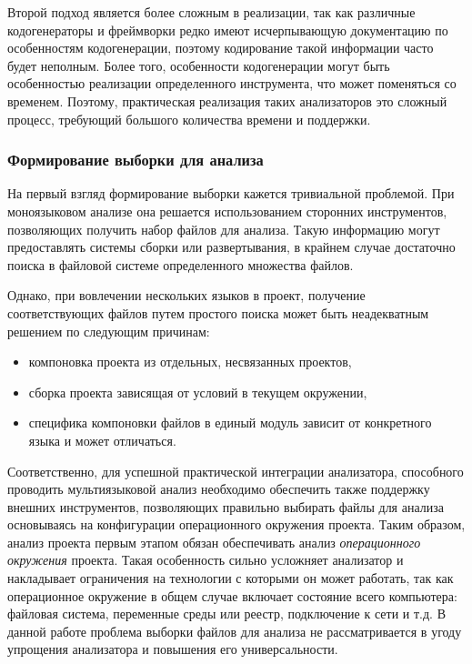 Второй подход является более сложным в реализации, так как различные кодогенераторы и фреймворки редко
имеют исчерпывающую документацию по особенностям кодогенерации, поэтому кодирование такой информации
часто будет неполным. Более того, особенности кодогенерации могут быть особенностью реализации
определенного инструмента, что может поменяться со временем. Поэтому, практическая реализация
таких анализаторов это сложный процесс, требующий большого количества времени и поддержки.

\subsubsection{Формирование выборки для анализа}

На первый взгляд формирование выборки кажется тривиальной проблемой. При моноязыковом анализе она
решается использованием сторонних инструментов, позволяющих получить набор файлов для анализа.
Такую информацию могут предоставлять системы сборки или развертывания, в крайнем случае достаточно
поиска в файловой системе определенного множества файлов.

Однако, при вовлечении нескольких языков в проект, получение соответствующих файлов путем простого
поиска может быть неадекватным решением по следующим причинам:
\begin{itemize}
    \item компоновка проекта из отдельных, несвязанных проектов,
    \item сборка проекта зависящая от условий в текущем окружении,
    \item специфика компоновки файлов в единый модуль зависит от конкретного языка и может отличаться.
\end{itemize}
Соответственно, для успешной практической интеграции анализатора, способного проводить мультиязыковой анализ
необходимо обеспечить также поддержку внешних инструментов, позволяющих правильно выбирать файлы для
анализа основываясь на конфигурации операционного окружения проекта. Таким образом, анализ проекта
первым этапом обязан обеспечивать анализ \textit{операционного окружения} проекта. Такая особенность
сильно усложняет анализатор и накладывает ограничения на технологии с которыми он может работать, так
как операционное окружение в общем случае включает состояние всего компьютера: файловая система, переменные
среды или реестр, подключение к сети и т.д. В данной работе проблема выборки файлов для анализа
не рассматривается в угоду упрощения анализатора и повышения его универсальности.

